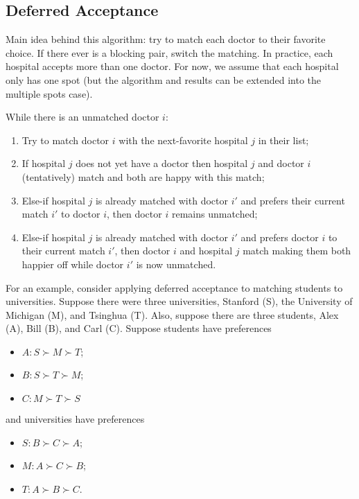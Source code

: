 \documentclass[dvipsnames]{article}
\theoremstyle{definition}
\theoremstyle{remark}
\newenvironment{mech}[1]{\begin{tcolorbox}[colback=red!5!white,colframe=red!75!black,title={#1}]}{\end{tcolorbox}}
\begin{document}
\subsection{Deferred Acceptance}
Main idea behind this algorithm: try to match each doctor to their favorite choice. If there ever is a blocking pair, switch the matching. In practice, each hospital accepts more than one doctor. For now, we assume that each hospital only has one spot (but the algorithm and results can be extended into the multiple spots case).

\begin{mech}{Deferred Acceptance}
	While there is an unmatched doctor $i$:
	\begin{enumerate}
		\item Try to match doctor $i$ with the next-favorite hospital $j$ in their list;
		\item If hospital $j$ does not yet have a doctor then hospital $j$ and doctor $i$ (tentatively) match and both are happy with this match;
		\item Else-if hospital $j$ is already matched with doctor $i'$ and prefers their current match $i'$ to doctor $i$, then doctor $i$ remains unmatched;
		\item Else-if hospital $j$ is already matched with doctor $i'$ and prefers doctor $i$ to their current match $i'$, then doctor $i$ and hospital $j$ match making them both happier off while doctor $i'$ is now unmatched.
	\end{enumerate}
\end{mech}

For an example, consider applying deferred acceptance to matching students to universities. Suppose there were three universities, Stanford (S), the University of Michigan (M), and Tsinghua (T). Also, suppose there are three students, Alex (A), Bill (B), and Carl (C).  Suppose students have preferences
\begin{itemize}
	\item $A: S \succ M \succ T$;
	\item $B: S \succ T \succ M$;
	\item $C: M \succ T \succ S$
\end{itemize}
and universities have preferences
\begin{itemize}
	\item $S: B \succ C \succ A$;
	\item $M: A \succ C \succ B$;
	\item $T: A \succ B \succ C$.
\end{itemize}
\end{document}
